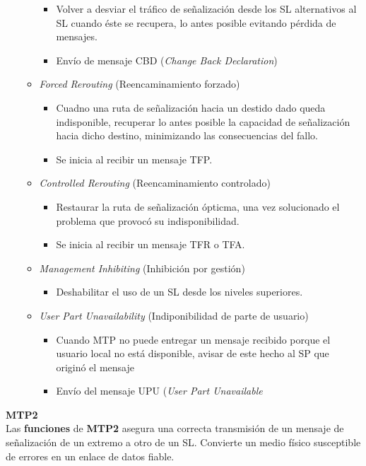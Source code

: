 \documentclass[10pt,portrait, twocolumn]{article}
\begin{document}
\begin{itemize}
\begin{itemize}
\begin{itemize}
			\item Volver a desviar el tráfico de señalización desde los SL alternativos al SL cuando éste se recupera, lo antes posible evitando pérdida de mensajes.
			\item Envío de mensaje CBD (\textit{Change Back Declaration})
			\end{itemize} 
		\item \textit{Forced Rerouting} (Reencaminamiento forzado)
			\begin{itemize}
			\item Cuadno una ruta de señalización hacia un destido dado queda indisponible, recuperar lo antes posible la capacidad de señalización hacia dicho destino, minimizando las consecuencias del fallo.
			\item Se inicia al recibir un mensaje TFP.
			\end{itemize}
		\item \textit{Controlled Rerouting} (Reencaminamiento controlado)
			\begin{itemize}
			\item Restaurar la ruta de señalización ópticma, una vez solucionado el problema que provocó su indisponibilidad.
			\item Se inicia al recibir un mensaje TFR o TFA.
			\end{itemize}
		\item \textit{Management Inhibiting} (Inhibición por gestión)
			\begin{itemize}
			\item Deshabilitar el uso de un SL desde los niveles superiores.
			\end{itemize}
		\item \textit{User Part Unavailability} (Indiponibilidad de parte de usuario)
			\begin{itemize}
			\item Cuando MTP no puede entregar un mensaje recibido porque el usuario local no está disponible, avisar de este hecho al SP que originó el mensaje
			\item Envío del mensaje UPU (\textit{User Part Unavailable}
			\end{itemize}
		\end{itemize}
	\end{itemize}

\textbf{MTP2}\\

Las \textbf{funciones} de \textbf{MTP2} asegura una correcta transmisión de un mensaje de señalización de un extremo a otro de un SL. Convierte un medio físico susceptible de errores en un enlace de datos fiable.
\end{document}
